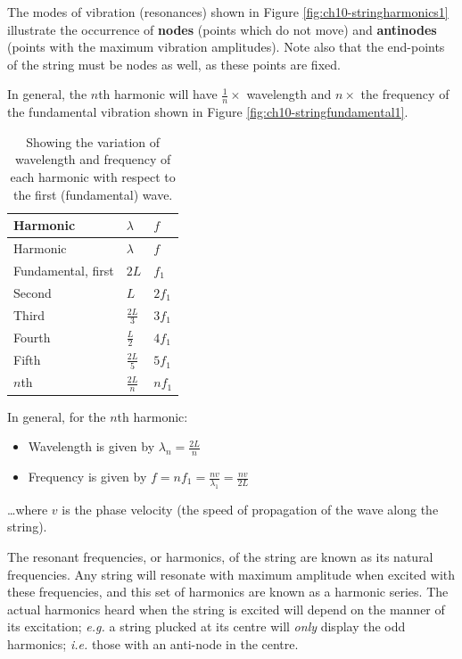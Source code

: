 \documentclass[
]{book}
\providecommand{\tightlist}{%
  \setlength{\itemsep}{0pt}\setlength{\parskip}{0pt}}
\begin{document}
The modes of vibration (resonances) shown in Figure \ref{fig:ch10-stringharmonics1} illustrate the occurrence of \textbf{nodes} (points which do not move) and \textbf{antinodes} (points with the maximum vibration amplitudes). Note also that the end-points of the string must be nodes as well, as these points are fixed.

In general, the \(n\)th harmonic will have \(\frac{1}{n} \times\) wavelength and \(n \times\) the frequency of the fundamental vibration shown in Figure \ref{fig:ch10-stringfundamental1}.

\begin{longtable}[]{@{}lll@{}}
\caption{\label{tab:ch10-standingfrequencies} Showing the variation of wavelength and frequency of each harmonic with respect to the first (fundamental) wave.}\tabularnewline
\toprule
Harmonic & \(\lambda\) & \(f\) \\
\midrule
\endfirsthead
\toprule
Harmonic & \(\lambda\) & \(f\) \\
\midrule
\endhead
Fundamental, first & \(2L\) & \(f_1\) \\
Second & \(L\) & \(2f_1\) \\
Third & \(\frac{2L}{3}\) & \(3f_1\) \\
Fourth & \(\frac{L}{2}\) & \(4f_1\) \\
Fifth & \(\frac{2L}{5}\) & \(5f_1\) \\
\(n\)th & \(\frac{2L}{n}\) & \(nf_1\) \\
\bottomrule
\end{longtable}

In general, for the \(n\)th harmonic:

\begin{itemize}
\tightlist
\item
  Wavelength is given by \(\lambda_n = \frac{2L}{n}\)
\item
  Frequency is given by \(f = nf_1 = \frac{nv}{\lambda_1} = \frac{nv}{2L}\)
\end{itemize}

\ldots where \(v\) is the phase velocity (the speed of propagation of the wave along the string).

The resonant frequencies, or harmonics, of the string are known as its natural frequencies. Any string will resonate with maximum amplitude when excited with these frequencies, and this set of harmonics are known as a harmonic series. The actual harmonics heard when the string is excited will depend on the manner of its excitation; \emph{e.g.} a string plucked at its centre will \emph{only} display the odd harmonics; \emph{i.e.} those with an anti-node in the centre.
\end{document}

